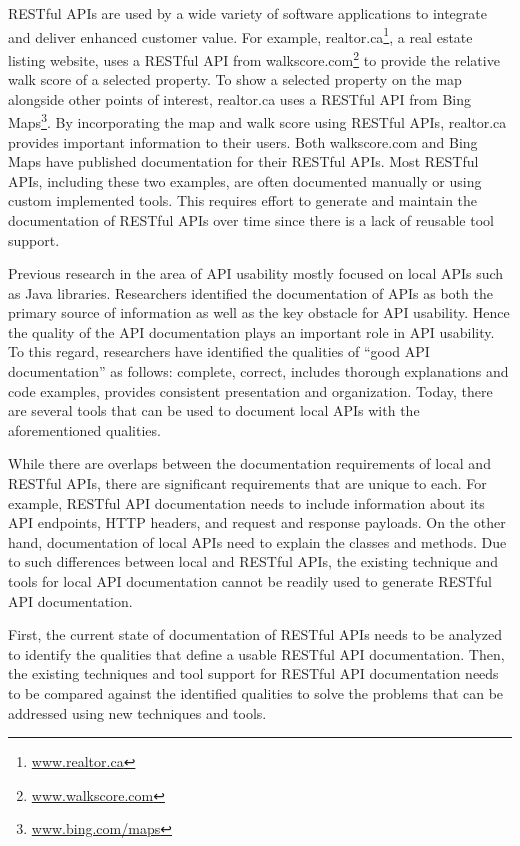 \documentclass[11pt,oneside]{book}
\begin{document}
RESTful APIs are used by a wide variety of software applications to integrate and deliver enhanced customer value. For example, realtor.ca\footnote{\url{www.realtor.ca}}, a real estate listing website, uses a RESTful API from walkscore.com\footnote{\url{www.walkscore.com}} to provide the relative walk score of a selected property. To show a selected property on the map alongside other points of interest,  realtor.ca uses a RESTful API from Bing Maps\footnote{\url{www.bing.com/maps}}. By incorporating the map and walk score using RESTful APIs, realtor.ca provides important information to their users. Both walkscore.com and Bing Maps have published documentation for their RESTful APIs. Most RESTful APIs, including these two examples, are often documented manually or using custom implemented tools. This requires effort to generate and maintain the documentation of RESTful APIs over time since there is a lack of reusable tool support.

Previous research in the area of API usability mostly focused on local APIs such as Java libraries. Researchers identified the documentation of APIs as both the primary source of information as well as the key obstacle for API usability. Hence the quality of the API documentation plays an important role in API usability. To this regard, researchers have identified the qualities of ``good API documentation'' as follows: complete, correct, includes thorough explanations and code examples, provides consistent presentation and organization. Today, there are several tools that can be used to document local APIs with the aforementioned qualities.

While there are overlaps between the documentation requirements of local and RESTful APIs, there are significant requirements that are unique to each. For example, RESTful API documentation needs to include information about its API endpoints, HTTP headers, and request and response payloads. On the other hand, documentation of local APIs need to explain the classes and methods. Due to such differences between local and RESTful APIs, the existing technique and tools for local API documentation cannot be readily used to generate RESTful API documentation.

First, the current state of documentation of RESTful APIs needs to be analyzed to identify the qualities that define a usable RESTful API documentation. Then, the existing techniques and tool support for RESTful API documentation needs to be compared against the identified qualities to solve the problems that can be addressed using new techniques and tools.
\end{document}
